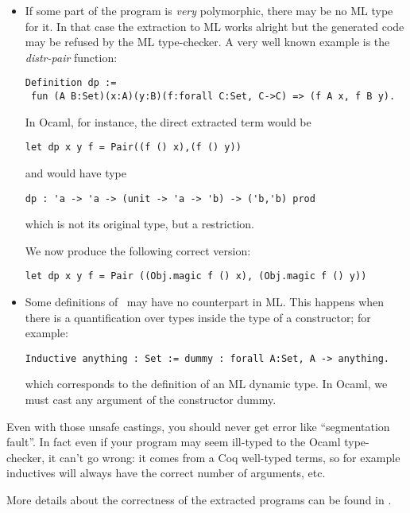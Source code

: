 \begin{itemize}
  \item If some part of the program is {\em very} polymorphic, there
    may be no ML type for it. In that case the extraction to ML works
    alright but the generated code may be refused by the ML
    type-checker. A very well known example is the {\em distr-pair}
    function:
\begin{verbatim}
Definition dp := 
 fun (A B:Set)(x:A)(y:B)(f:forall C:Set, C->C) => (f A x, f B y).
\end{verbatim}

In Ocaml, for instance, the direct extracted term would be
\begin{verbatim}
let dp x y f = Pair((f () x),(f () y))
\end{verbatim}

and would have type
\begin{verbatim}
dp : 'a -> 'a -> (unit -> 'a -> 'b) -> ('b,'b) prod
\end{verbatim}

which is not its original type, but a restriction.

We now produce the following correct version:
\begin{verbatim}
let dp x y f = Pair ((Obj.magic f () x), (Obj.magic f () y))
\end{verbatim}

  \item Some definitions of \Coq\ may have no counterpart in ML. This
    happens when there is a quantification over types inside the type
    of a constructor; for example:
\begin{verbatim}
Inductive anything : Set := dummy : forall A:Set, A -> anything.
\end{verbatim}

which corresponds to the definition of an ML dynamic type.
In Ocaml, we must cast any argument of the constructor dummy.

\end{itemize}

Even with those unsafe castings, you should never get error like
``segmentation fault''. In fact even if your program may seem
ill-typed to the Ocaml type-checker, it can't go wrong: it comes 
from a Coq well-typed terms, so for example inductives will always 
have the correct number of arguments, etc. 

More details about the correctness of the extracted programs can be 
found in \cite{Let02}.

